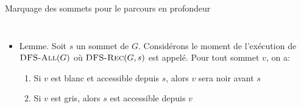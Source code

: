 \begin{frame}{Marquage des sommets pour le parcours en profondeur}

\begin{columns}
\begin{column}{5cm}
\begin{center}
{\small
{}
}
\end{center}
\end{column}
\begin{column}{5cm}
\begin{center}
{\small
{}
}
\end{center}
\end{column}
\end{columns}

\bigskip

\bigskip

\begin{itemize}
\item \alert{Lemme.} Soit $s$ un sommet de $G$. Considérons le moment
  de l'exécution de $\textnormal{\scshape DFS-All}(G)$ où $\textnormal{\scshape DFS-Rec}(G,s)$ est
  appelé. Pour tout sommet $v$, on a:
\begin{enumerate}
\item Si $v$ est blanc et accessible depuis $s$, alors $v$ sera noir avant $s$
\item Si $v$ est gris, alors $s$ est accessible depuis $v$
\end{enumerate}
\end{itemize}


\end{frame}

